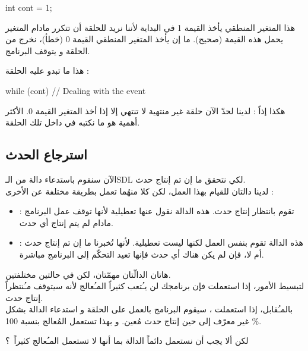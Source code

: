 \begin{Csource}
int cont = 1;
\end{Csource}

هذا المتغير المنطقي يأخذ القيمة 1 في البداية لأننا نريد للحلقة أن تتكرر مادام المتغير
يحمل هذه القيمة (صحيح). ما إن يأخذ المتغير المنطقي القيمة 0 (خطأ)، نخرج من الحلقة و يتوقف البرنامج.

هذا ما تبدو عليه الحلقة :

\begin{Csource}
while (cont)
{
	// Dealing with the event
}
\end{Csource}

هكذا إذاً : لدينا لحدّ الآن حلقة غير منتهية لا تنتهي إلا إذا أخذ المتغير 
القيمة 0. الأكثر أهمية هو ما نكتبه في داخل تلك الحلقة.

\subsection{استرجاع الحدث}

الآن سنقوم باستدعاء دالة من الـ\textenglish{SDL}
لكي نتحقق ما إن تم إنتاج حدث.\\
لدينا دالتان للقيام بهذا العمل، لكن كلا منهُما تعمل بطريقة مختلفة عن الأخرى :

\begin{itemize}
	\item {} :
	تقوم بانتظار إنتاج حدث. هذه الدالة نقول عنها تعطيلية لأنها توقف عمل البرنامج مادام لم يتم إنتاج أي حدث.
	\item {} :
	هذه الدالة تقوم بنفس العمل لكنها ليست تعطيلية. لأنها تُخبرنا ما إن تم إنتاج حدث أم لا، فإن لم يكن هناك أي حدث فإنها تعيد التحكّم إلى البرنامج مباشرة.
\end{itemize}

هاتان الدالّتان مهمّتان، لكن في حالتين مختلفتين.\\
لتبسيط الأمور، إذا استعملت 
فإن برنامجك لن يـُتعب كثيراً المـُعالج لأنه سيتوقف مـُنتظراً إنتاج حدث.\\
بالمـُقابل، إذا استعملت 
،
سيقوم البرنامج بالعمل على الحلقة
و استدعاء الدالة 
بشكل غير معرّف إلى حين إنتاج حدث مُعين. و بهذا تستعمل المُعالج  بنسبة 100
\%.

\begin{question}
لكن ألا يجب أن نستعمل دائماً الدالة 
بما أنها لا تستعمل المـُعالج كثيراً~؟
\end{question}

